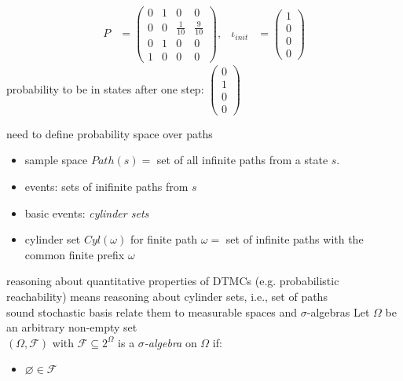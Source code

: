 \documentclass[a4paper, 10pt]{article}
\begin{document}
\begin{mdframed}
\begin{itemize}
\end{itemize}
\begin{multicols}{2}
\begin{center}
\scalebox{1}{}
\end{center}
\begin{align*}
P&=
\begin{pmatrix}
0 & 1 & 0 & 0 \\
0 & 0 & \frac{1}{10} & \frac{9}{10} \\
0 & 1 & 0 & 0 \\
1 & 0 & 0 & 0
\end{pmatrix},
&\iota_{init}&=\begin{pmatrix}1\\0\\0\\0\end{pmatrix}
\end{align*}
probability to be in states after one step: $\begin{pmatrix}
0 \\ 1 \\ 0 \\ 0
\end{pmatrix}$
\end{multicols}
need to define probability space over paths
\begin{itemize}
    \item sample space $Path(s)=$ set of all infinite paths from a state $s$.
    \item events: sets of inifinite paths from $s$
    \item basic events: \emph{cylinder sets}
    \item cylinder set $Cyl(\omega)$ for finite path $\omega=$ set of infinite paths with the common finite prefix $\omega$
\end{itemize}
reasoning about quantitative properties of DTMCs (e.g. probabilistic reachability) means reasoning about cylinder sets, i.e., set of paths\\
sound stochastic basis \follows relate them to measurable spaces and $\sigma$-algebras
Let $\Omega$ be an arbitrary non-empty set\\
$(\Omega,\mathcal{F})$ with $\mathcal{F}\subseteq2^\Omega$ is a \emph{$\sigma$-algebra} on $\Omega$ if:
\begin{itemize}
    \item $\varnothing\in\mathcal{F}$

\end{itemize}
\end{mdframed}
\end{document}
